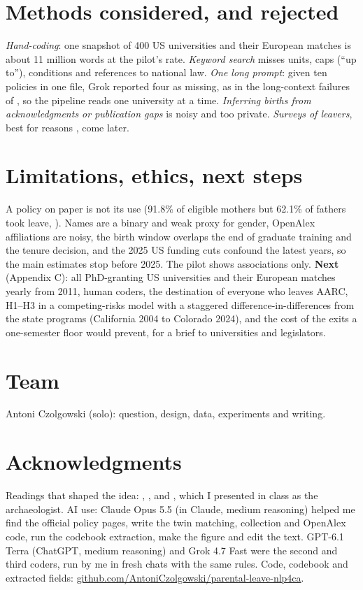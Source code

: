 \documentclass[10pt,twocolumn]{article}
\begin{document}
\section{Methods considered, and rejected}
\emph{Hand-coding}: one snapshot of 400 US universities and their European matches is about 11 million words at the pilot's rate. \emph{Keyword search} misses units, caps (``up to''), conditions and references to national law. \emph{One long prompt}: given ten policies in one file, Grok reported four as missing, as in the long-context failures of \citet{karpinska2024}, so the pipeline reads one university at a time. \emph{Inferring births from acknowledgments or publication gaps} is noisy and too private. \emph{Surveys of leavers}, best for reasons \citep{spoon2023}, come later.

\section{Limitations, ethics, next steps}
A policy on paper is not its use (91.8\% of eligible mothers but 62.1\% of fathers took leave, \citealp{morgan2021}). Names are a binary and weak proxy for gender, OpenAlex affiliations are noisy, the birth window overlaps the end of graduate training and the tenure decision, and the 2025 US funding cuts confound the latest years, so the main estimates stop before 2025. The pilot shows associations only. \textbf{Next} (Appendix C): all PhD-granting US universities and their European matches yearly from 2011, human coders, the destination of everyone who leaves AARC, H1--H3 in a competing-risks model with a staggered difference-in-differences from the state programs (California 2004 to Colorado 2024), and the cost of the exits a one-semester floor would prevent, for a brief to universities and legislators.

\section*{Team}
Antoni Czolgowski (solo): question, design, data, experiments and writing.

\section*{Acknowledgments}
Readings that shaped the idea: \citet{gligoric2025}, \citet{bamman2024}, \citet{than2025} and \citet{karpinska2024}, which I presented in class as the archaeologist. AI use: Claude Opus 5.5 (in Claude, medium reasoning) helped me find the official policy pages, write the twin matching, collection and OpenAlex code, run the codebook extraction, make the figure and edit the text. GPT-6.1 Terra (ChatGPT, medium reasoning) and Grok 4.7 Fast were the second and third coders, run by me in fresh chats with the same rules. Code, codebook and extracted fields: \url{github.com/AntoniCzolgowski/parental-leave-nlp4ca}.
\end{document}
